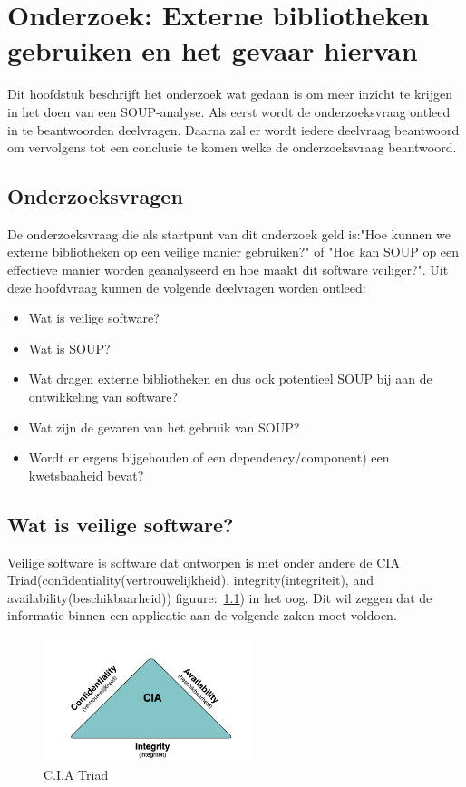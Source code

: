 \chapter{Onderzoek: Externe bibliotheken gebruiken en het gevaar hiervan}\label{ch:externeGevaren}
Dit hoofdstuk beschrijft het onderzoek wat gedaan is om meer inzicht te krijgen in het doen van een SOUP-analyse. Als eerst wordt de onderzoeksvraag ontleed in te beantwoorden deelvragen. Daarna zal er wordt iedere deelvraag beantwoord om vervolgens tot een conclusie te komen welke de onderzoeksvraag beantwoord.


\section{Onderzoeksvragen} \label{sec:SOUPOnderzoeksvragen}
De onderzoeksvraag die als startpunt van dit onderzoek geld is:"Hoe kunnen we externe bibliotheken op een veilige manier gebruiken?" of "Hoe kan SOUP op een effectieve manier worden geanalyseerd en hoe maakt dit software veiliger?". Uit deze hoofdvraag kunnen de volgende deelvragen worden ontleed:
\begin{itemize}
    \item Wat is veilige software?
    \item Wat is SOUP?
    \item Wat dragen externe bibliotheken en dus ook potentieel SOUP bij aan de ontwikkeling van software?
    \item Wat zijn de gevaren van het gebruik van SOUP?
    \item Wordt er ergens bijgehouden of een dependency/component) een kwetsbaaheid bevat?
\end{itemize}



\section{Wat is veilige software?}
Veilige software is software dat ontworpen is met onder andere de CIA Triad(confidentiality(vertrouwelijkheid), integrity(integriteit), and availability(beschikbaarheid)) figuure:~\ref{fig:CIA}) in het oog. Dit wil zeggen dat de informatie binnen een applicatie aan de volgende zaken moet voldoen.
\begin{figure}[H]
    \centering
    \includegraphics[width=6cm]{gfx/CIA}
    \caption{C.I.A Triad}
    \label{fig:CIA}
\end{figure}

